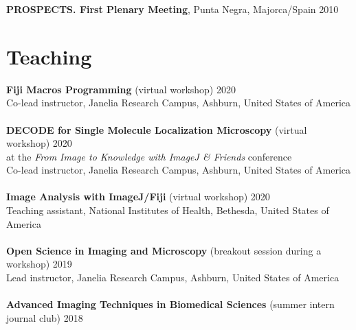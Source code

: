 \documentclass[margin,line]{res}
\begin{document}
\begin{resume}
\vspace*{-2.5mm}
{\bf PROSPECTS. First Plenary Meeting}, Punta Negra, Majorca/Spain  \hfill 2010 %


\section{\sc Teaching}

{\bf Fiji Macros Programming} (virtual workshop)  \hfill 2020\\
Co-lead instructor, Janelia Research Campus, Ashburn, United States of America\\
\vspace*{-3mm}\\
{\bf DECODE for Single Molecule Localization Microscopy} (virtual workshop)  \hfill 2020\\
at the \emph{From Image to Knowledge with ImageJ \& Friends} conference\\
Co-lead instructor, Janelia Research Campus, Ashburn, United States of America\\
\vspace*{-3mm}\\
{\bf  Image Analysis with ImageJ/Fiji} (virtual workshop)  \hfill 2020\\
 Teaching assistant, National Institutes of Health, Bethesda, United States of America\\
\vspace*{-3mm}\\
{\bf  Open Science in Imaging and Microscopy} (breakout session during a workshop)  \hfill 2019\\
Lead instructor, Janelia Research Campus, Ashburn, United States of America\\
\vspace*{-3mm}\\
{\bf Advanced Imaging Techniques in Biomedical Sciences} (summer intern journal club) \hfill {2018}\\

\end{resume}
\end{document}
